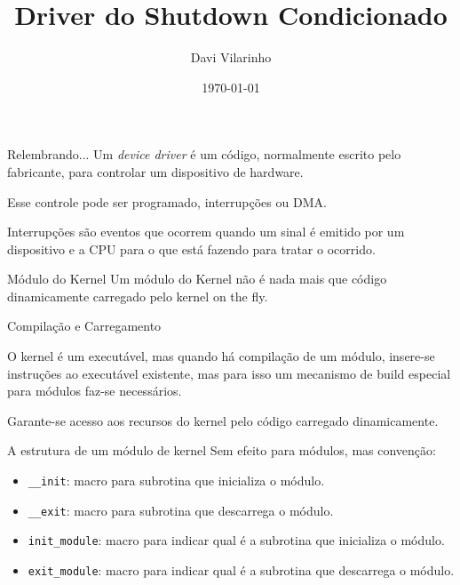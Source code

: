 \documentclass{beamer}
\title{Driver do Shutdown Condicionado}
\author{Davi Vilarinho}
\institute{UFU \\ Faculdade de Computação \\ Universidade Federal de Uberlândia}
\date{\today}
\begin{document}
\begin{frame}
  \maketitle
\end{frame}

\begin{frame}{Relembrando...}
  Um \emph{device driver} é um código, normalmente escrito pelo fabricante, para
  controlar um dispositivo de hardware.

  Esse controle pode ser programado, interrupções ou DMA.

  Interrupções são eventos que ocorrem quando um sinal é emitido por um
  dispositivo e a CPU para o que está fazendo para tratar o ocorrido.
\end{frame}

\begin{frame}{Módulo do Kernel}
  Um módulo do Kernel não é nada mais que código dinamicamente carregado pelo
  kernel on the fly.

  \begin{block}{Compilação e Carregamento}

  O kernel é um executável, mas quando há compilação de um módulo, insere-se
  instruções ao executável existente, mas para isso um mecanismo de build 
  especial para módulos faz-se necessários.
  
  Garante-se acesso aos recursos do kernel pelo código carregado dinamicamente.
  \end{block}
\end{frame}

\begin{frame}{A estrutura de um módulo de kernel}
  Sem efeito para módulos, mas convenção:

  \begin{itemize}
      \item \texttt{\_\_init}: macro para subrotina que inicializa o módulo.
    
      \item \texttt{\_\_exit}: macro para subrotina que descarrega o módulo.
    
      \item \texttt{init\_module}: macro para indicar qual é a subrotina que inicializa o módulo.
    
      \item \texttt{exit\_module}: macro para indicar qual é a subrotina que descarrega o módulo.
  \end{itemize}
\end{frame}
\end{document}
